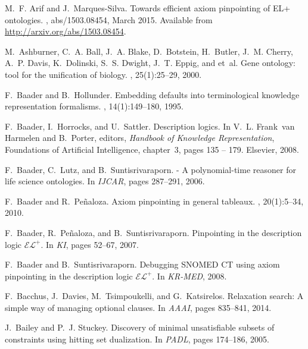\documentclass{llncs}
\begin{document}
\begin{thebibliography}{10}

M.~F. Arif and J.~Marques{-}Silva.
\newblock Towards efficient axiom pinpointing of {EL+} ontologies.
, abs/1503.08454, March 2015.
\newblock Available from \url{http://arxiv.org/abs/1503.08454}.

M.~Ashburner, C.~A. Ball, J.~A. Blake, D.~Botstein, H.~Butler, J.~M. Cherry,
  A.~P. Davis, K.~Dolinski, S.~S. Dwight, J.~T. Eppig, and et~al.
\newblock Gene ontology: tool for the unification of biology.
, 25(1):25--29, 2000.

F.~Baader and B.~Hollunder.
\newblock Embedding defaults into terminological knowledge representation
  formalisms.
, 14(1):149--180, 1995.

F.~Baader, I.~Horrocks, and U.~Sattler.
\newblock Description logics.
\newblock In V.~L. Frank~van Harmelen and B.~Porter, editors, {\em Handbook of
  Knowledge Representation}, Foundations of Artificial Intelligence, chapter~3,
  pages 135 -- 179. Elsevier, 2008.

F.~Baader, C.~Lutz, and B.~Suntisrivaraporn.
 - {A} polynomial-time reasoner for life science ontologies.
\newblock In {\em IJCAR}, pages 287--291, 2006.

F.~Baader and R.~Pe{\~{n}}aloza.
\newblock Axiom pinpointing in general tableaux.
, 20(1):5--34, 2010.

F.~Baader, R.~Pe{\~{n}}aloza, and B.~Suntisrivaraporn.
\newblock Pinpointing in the description logic $\mathcal{EL}^{+}$.
\newblock In {\em KI}, pages 52--67, 2007.

F.~Baader and B.~Suntisrivaraporn.
\newblock Debugging {SNOMED} {CT} using axiom pinpointing in the description
  logic $\mathcal{EL}^{+}$.
\newblock In {\em KR-MED}, 2008.

F.~Bacchus, J.~Davies, M.~Tsimpoukelli, and G.~Katsirelos.
\newblock Relaxation search: {A} simple way of managing optional clauses.
\newblock In {\em AAAI}, pages 835--841, 2014.

J.~Bailey and P.~J. Stuckey.
\newblock Discovery of minimal unsatisfiable subsets of constraints using
  hitting set dualization.
\newblock In {\em PADL}, pages 174--186, 2005.


\end{thebibliography}
\end{document}
